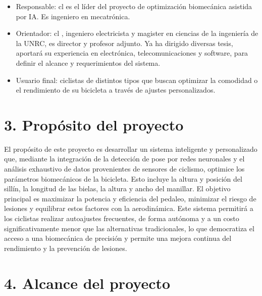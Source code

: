\documentclass[
11pt, %
]{charter}
\begin{document}
\begin{itemize}

\item Responsable: cl \authorname  es el líder del proyecto de optimización biomecánica asistida por IA. Es ingeniero en mecatrónica.

\item Orientador: cl \supname	, ingeniero electricista y magister en ciencias de la ingeniería de la UNRC, es director y profesor adjunto. Ya ha dirigido diversas tesis, aportará su experiencia en electrónica, telecomunicaciones y software, para definir el alcance y requerimientos del sistema.
\item Usuario final: ciclistas de distintos tipos que buscan optimizar la comodidad o el rendimiento de su bicicleta a través de ajustes personalizados.
\end{itemize}



\section{3. Propósito del proyecto}
\label{sec:proposito}
El propósito de este proyecto es desarrollar un sistema inteligente y personalizado que, mediante la integración de la detección de pose por redes neuronales y el análisis exhaustivo de datos provenientes de sensores de ciclismo, optimice los parámetros biomecánicos de la bicicleta. Esto incluye la altura y posición del sillín, la longitud de las bielas, la altura y ancho del manillar. El objetivo principal es maximizar la potencia y eficiencia del pedaleo, minimizar el riesgo de lesiones y equilibrar estos factores con la aerodinámica.
Este sistema permitirá a los ciclistas realizar autoajustes frecuentes, de forma autónoma y a un costo significativamente menor que las alternativas tradicionales, lo que democratiza el acceso a una biomecánica de precisión y permite una mejora continua del rendimiento y la prevención de lesiones.

\section{4. Alcance del proyecto}
\label{sec:alcance}
\end{document}
